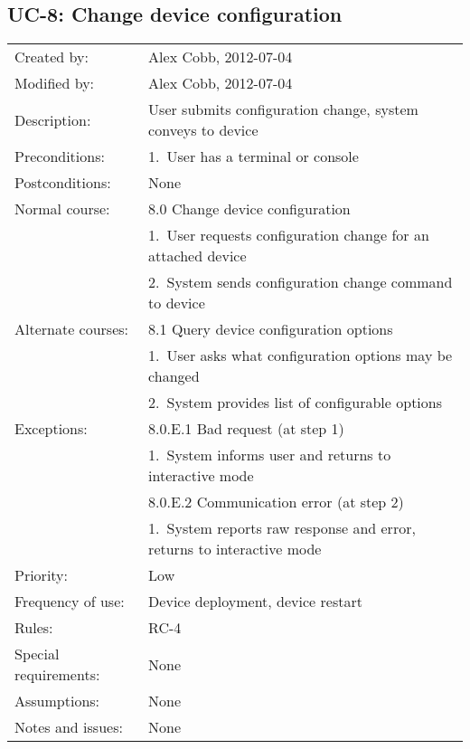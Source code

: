 \documentclass[pdftex,oneside,12pt,a4paper]{book}
\begin{document}
\subsection{UC-8: Change device configuration}
\begin{tabular}{|l|p{10cm}|}\hline
Created by: & Alex Cobb, 2012-07-04 \\
Modified by: & Alex Cobb, 2012-07-04 \\\hline
Description: & User submits configuration change, system conveys to device \\\hline
Preconditions: & 1.\ User has a terminal or console \\\hline
Postconditions: & None \\\hline
Normal course: & 8.0 Change device configuration \\
 & 1.\ User requests configuration change for an attached device \\
 & 2.\ System sends configuration change command to device\\\hline
Alternate courses: & 8.1 Query device configuration options \\
 & 1.\ User asks what configuration options may be changed\\
 & 2.\ System provides list of configurable options\\\hline
Exceptions: & 8.0.E.1 Bad request (at step 1) \\
 & 1.\ System informs user and returns to interactive mode\\\cline{2-2}
 & 8.0.E.2 Communication error (at step 2)\\
 & 1.\ System reports raw response and error, returns to interactive mode\\\hline
Priority: & Low \\\hline
Frequency of use: & Device deployment, device restart\\\hline
Rules: & RC-4\\\hline
Special requirements: & None\\\hline
Assumptions: & None\\\hline
Notes and issues: & None\\\hline
\end{tabular}
\end{document}
